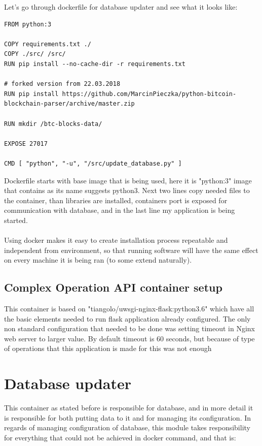\documentclass[12pt, en, eng, oneside]{mgr}
\begin{document}
Let's go through dockerfile for database updater and see what it looks like:
\begin{verbatim}
FROM python:3

COPY requirements.txt ./
COPY ./src/ /src/
RUN pip install --no-cache-dir -r requirements.txt

# forked version from 22.03.2018
RUN pip install https://github.com/MarcinPieczka/python-bitcoin-blockchain-parser/archive/master.zip

RUN mkdir /btc-blocks-data/

EXPOSE 27017

CMD [ "python", "-u", "/src/update_database.py" ]
\end{verbatim}

Dockerfile starts with base image that is being used, here it is "python:3" image that contains as its name suggests python3.
Next two lines copy needed files to the container, than libraries are installed, containers port is exposed for communication with database, and in the last line my application is being started.
\\
\\
Using docker makes it easy to create installation process repeatable and independent from environment, so that running software will have the same effect on every machine it is being ran (to some extend naturally). 

\subsection{Complex Operation API container setup}
This container is based on "tiangolo/uwsgi-nginx-flask:python3.6" which have all the basic elements needed to run flask application already configured. The only non standard configuration that needed to be done was setting timeout in Nginx web server to larger value. By default timeout is 60 seconds, but because of type of operations that this application is made for this was not enough  

\section{Database updater}
This container as stated before is responsible for database, and in more detail it is responsible for both putting data to it and for managing its configuration. In regards of managing configuration of database, this module takes responsibility for everything that could not be achieved in docker command, and that is:
\end{document}
